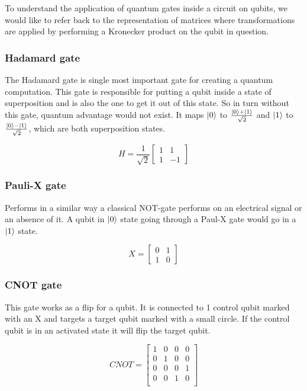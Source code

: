 To understand the application of quantum gates inside a circuit on qubits, we would like to refer back to the representation of matrices where transformations are applied by performing a Kronecker product on the qubit in question.

\subsubsection{Hadamard gate}
The Hadamard gate is single most important gate for creating a quantum computation. This gate is responsible for putting a qubit inside a state of superposition and is also the one to get it out of this state. So in turn without this gate, quantum advantage would not exist. It maps  $\ket{0}$ to $\frac{\ket{0} + \ket{1}}{\sqrt{2}}$ and $\ket{1}$ to $\frac{\ket{0}-\ket{1}}{\sqrt{2}}$, which are both superposition states.

\[
H=\frac{1}{\sqrt{2}}\begin{bmatrix}
1 & 1 \\
1 & -1
\end{bmatrix}
\]

\subsubsection{Pauli-X gate}
Performs in a similar way a classical NOT-gate performs on an electrical signal or an absence of it. A qubit in $\ket{0}$ state going through a Paul-X gate would go in a $\ket{1}$ state.

\[
X=
\begin{bmatrix}
0 & 1 \\
1 & 0
\end{bmatrix}
\]

\subsubsection{CNOT gate}
This gate works as a flip for a qubit. It is connected to 1 control qubit marked with an X and targets a target qubit marked with a small circle. If the control qubit is in an activated state it will flip the target qubit.

 \[
 CNOT=
 \begin{bmatrix}
 1 & 0 & 0 & 0 \\
 0 & 1 & 0 & 0 \\
 0 & 0 & 0 & 1 \\
 0 & 0 & 1 & 0 \\	
 \end{bmatrix}
 \]

